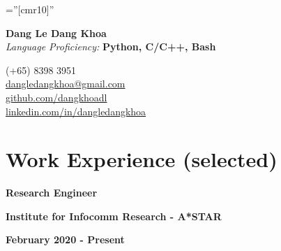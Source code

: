 \documentclass[10pt]{article}
\begin{document}
    \pagestyle{empty}       %
    \font\fb=''[cmr10]''    %

    \begin{multicols}{2}
        \begin{flushleft}
            \textbf{{\Huge Dang Le Dang Khoa }} \\
            \vspace{3mm}
            \emph{Language Proficiency:} \textbf{Python, C/C++, Bash}
        \end{flushleft}

        \columnbreak

        \begin{flushright}
            \textsc (+65) 8398 3951 \\
            \href{mailto:dangledangkhoa@gmail.com}{dangledangkhoa@gmail.com} \\
            \href{https://github.com/dangkhoadl}{github.com/dangkhoadl} \\
            \href{https://sg.linkedin.com/in/dangledangkhoa}{linkedin.com/in/dangledangkhoa}
        \end{flushright}
    \end{multicols}


    \section{Work Experience (selected)}

        \begin{multicols}{3}
            \begin{flushleft}
                \textbf{Research Engineer}
            \end{flushleft}

            \columnbreak

            \begin{center}
                \textbf{Institute for Infocomm Research - A*STAR}
            \end{center}

            \columnbreak

            \begin{flushright}
                \textbf{February 2020 - Present}
            \end{flushright}
        \end{multicols}
\end{document}
